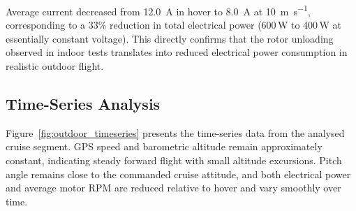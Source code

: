 Average current decreased from \SI{12.0}{\ampere} in hover to \SI{8.0}{\ampere} at \SI{10}{\meter\per\second}, corresponding to a 33\% reduction in total electrical power (600\,W to 400\,W at essentially constant voltage).
This directly confirms that the rotor unloading observed in indoor tests translates into reduced electrical power consumption in realistic outdoor flight.

\subsection{Time-Series Analysis}\label{sec:outdoor-timeseries}

Figure~\ref{fig:outdoor_timeseries} presents the time-series data from the analysed cruise segment.
GPS speed and barometric altitude remain approximately constant, indicating steady forward flight with small altitude excursions.
Pitch angle remains close to the commanded cruise attitude, and both electrical power and average motor RPM are reduced relative to hover and vary smoothly over time.

